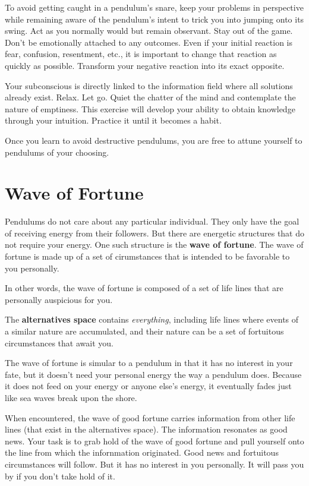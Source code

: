 \documentclass[
  openany]{book}
\begin{document}
To avoid getting caught in a pendulum's snare, keep your problems in perspective while remaining aware of the pendulum's intent to trick you into jumping onto its swing. Act as you normally would but remain observant. Stay out of the game. Don't be emotionally attached to any outcomes. Even if your initial reaction is fear, confusion, resentment, etc., it is important to change that reaction as quickly as possible. Transform your negative reaction into its exact opposite.

Your subconscious is directly linked to the information field where all solutions already exist. Relax. Let go. Quiet the chatter of the mind and contemplate the nature of emptiness. This exercise will develop your ability to obtain knowledge through your intuition. Practice it until it becomes a habit.

Once you learn to avoid destructive pendulums, you are free to attune yourself to pendulums of your choosing.

\hypertarget{wave-of-fortune}{%
\chapter{Wave of Fortune}\label{wave-of-fortune}}

Pendulums do not care about any particular individual. They only have the goal of receiving energy from their followers. But there are energetic structures that do not require your energy. One such structure is the \textbf{wave of fortune}. The wave of fortune is made up of a set of cirumstances that is intended to be favorable to you personally.

In other words, the wave of fortune is composed of a set of life lines that are personally auspicious for you.

The \textbf{alternatives space} contains \emph{everything}, including life lines where events of a similar nature are accumulated, and their nature can be a set of fortuitous circumstances that await you.

The wave of fortune is simular to a pendulum in that it has no interest in your fate, but it doesn't need your personal energy the way a pendulum does. Because it does not feed on your energy or anyone else's energy, it eventually fades just like sea waves break upon the shore.

When encountered, the wave of good fortune carries information from other life lines (that exist in the alternatives space). The information resonates as good news. Your task is to grab hold of the wave of good fortune and pull yourself onto the line from which the infornmation originated. Good news and fortuitous circumstances will follow. But it has no interest in you personally. It will pass you by if you don't take hold of it.
\end{document}
